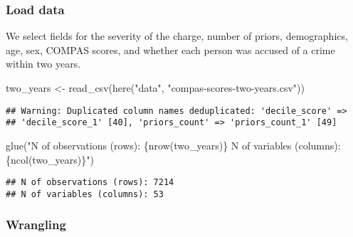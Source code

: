 \documentclass[
]{book}
\newenvironment{Shaded}{\begin{snugshade}}{\end{snugshade}}
\newcommand{\FunctionTok}[1]{\textcolor[rgb]{0.00,0.00,0.00}{#1}}
\newcommand{\NormalTok}[1]{#1}
\newcommand{\OtherTok}[1]{\textcolor[rgb]{0.56,0.35,0.01}{#1}}
\newcommand{\StringTok}[1]{\textcolor[rgb]{0.31,0.60,0.02}{#1}}
\begin{document}
\hypertarget{load-data}{%
\subsubsection{Load data}\label{load-data}}

We select fields for the severity of the charge, number of priors, demographics, age, sex, COMPAS scores, and whether each person was accused of a crime within two years.

\begin{Shaded}
\begin{Highlighting}[]
\NormalTok{two\_years }\OtherTok{\textless{}{-}} \FunctionTok{read\_csv}\NormalTok{(}\FunctionTok{here}\NormalTok{(}\StringTok{"data"}\NormalTok{, }\StringTok{"compas{-}scores{-}two{-}years.csv"}\NormalTok{))}
\end{Highlighting}
\end{Shaded}

\begin{verbatim}
## Warning: Duplicated column names deduplicated: 'decile_score' =>
## 'decile_score_1' [40], 'priors_count' => 'priors_count_1' [49]
\end{verbatim}

\begin{Shaded}
\begin{Highlighting}[]
\FunctionTok{glue}\NormalTok{(}\StringTok{"N of observations (rows): \{nrow(two\_years)\}}
\StringTok{      N of variables (columns): \{ncol(two\_years)\}"}\NormalTok{)}
\end{Highlighting}
\end{Shaded}

\begin{verbatim}
## N of observations (rows): 7214
## N of variables (columns): 53
\end{verbatim}

\hypertarget{wrangling}{%
\subsubsection{Wrangling}\label{wrangling}}
\end{document}
